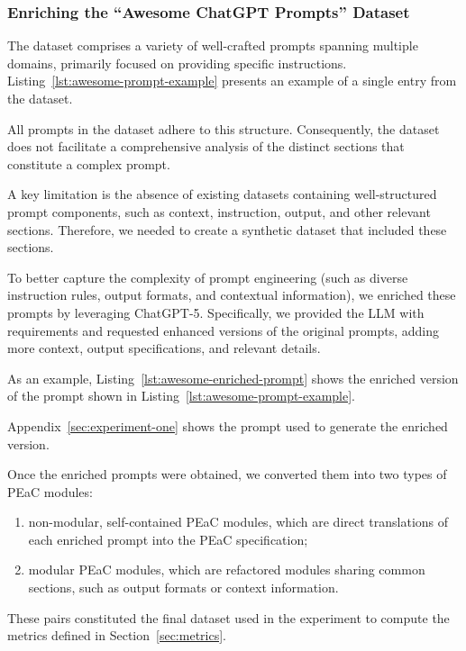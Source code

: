 \subsubsection{Enriching the ``Awesome ChatGPT Prompts'' Dataset}
The dataset comprises a variety of well-crafted prompts spanning multiple domains, primarily focused on providing specific instructions. 
Listing~\ref{lst:awesome-prompt-example} presents an example of a single entry from the dataset.

All prompts in the dataset adhere to this structure. 
Consequently, the dataset does not facilitate a comprehensive analysis of the distinct sections that constitute a complex prompt.

A key limitation is the absence of existing datasets containing well-structured prompt components, such as context, instruction, output, and other relevant sections. 
Therefore, we needed to create a synthetic dataset that included these sections. 



To better capture the complexity of prompt engineering (such as diverse instruction rules, output formats, and contextual information), we enriched these prompts by leveraging ChatGPT-5. Specifically, we provided the LLM with requirements and requested enhanced versions of the original prompts, adding more context, output specifications, and relevant details. 

As an example, Listing~\ref{lst:awesome-enriched-prompt} shows the enriched version of the prompt shown in Listing~\ref{lst:awesome-prompt-example}.

Appendix~\ref{sec:experiment-one} shows the prompt used to generate the enriched version.


Once the enriched prompts were obtained, we converted them into two types of PEaC modules:

\begin{enumerate}
    \item non-modular, self-contained PEaC modules, which are direct translations of each enriched prompt into the PEaC specification;
\item modular PEaC modules, which are refactored modules sharing common sections, such as output formats or context information.
\end{enumerate}
These pairs constituted the final dataset used in the experiment to compute the metrics defined in Section~\ref{sec:metrics}.

